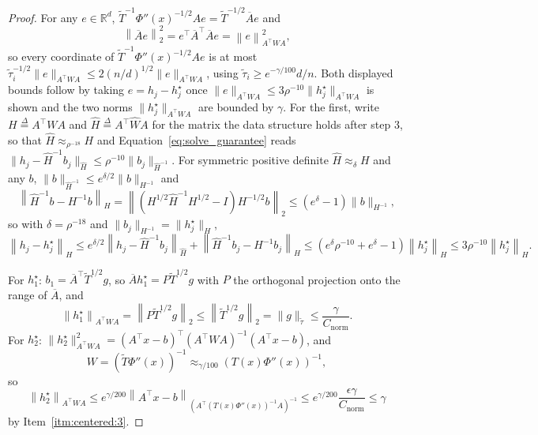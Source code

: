 \documentclass[11pt]{article}
\newcommand{\R}{\mathbb R}
\newcommand{\tautil}{\widetilde{\tau}}
\newcommand{\defeq}{\stackrel{\Delta}{=}}
\newcommand{\Cnorm}{C_{\mathrm{norm}}}
\begin{document}
\begin{proof}
For any $e \in \R^{d}$,
$\widetilde{T}^{-1} \Phi''(x)^{-1/2} A e = \widetilde{T}^{-1/2} \overline{A} e$
and
\[
\left\| \overline{A} e \right\|_{2}^{2}
=
e^\top \overline{A}^\top \overline{A} e
=
\left\| e \right\|_{A^\top W A}^{2},
\]
so every coordinate of $\widetilde{T}^{-1} \Phi''(x)^{-1/2} A e$ is at most
$\tautil_i^{-1/2} \|e\|_{A^\top W A} \le 2 (n/d)^{1/2} \|e\|_{A^\top W A}$,
using $\tautil_i \ge e^{-\gamma/100} d / n$.
Both displayed bounds follow by taking $e = h_j - h_j^{\star}$ once
$\|e\|_{A^\top W A} \le 3 \rho^{-10} \|h_j^{\star}\|_{A^\top W A}$ is shown and
the two norms $\|h_j^{\star}\|_{A^\top W A}$ are bounded by
$\gamma$.
For the first, write $H \defeq A^\top W A$ and
$\widehat H \defeq A^\top \widehat W A$ for the matrix the data structure holds
after step 3, so that $\widehat H \approx_{\rho^{-18}} H$ and
Equation~\eqref{eq:solve_guarantee} reads
$\|h_j - \widehat H^{-1} b_j\|_{\widehat H} \le \rho^{-10} \|b_j\|_{\widehat H^{-1}}$.
For symmetric positive definite $\widehat H \approx_{\delta} H$ and any
$b$,
$\|b\|_{\widehat H^{-1}} \le e^{\delta / 2} \|b\|_{H^{-1}}$ and
\[
\left\| \widehat H^{-1} b - H^{-1} b \right\|_{H}
=
\left\| \left( H^{1/2} \widehat H^{-1} H^{1/2} - I \right)
H^{-1/2} b \right\|_{2}
\le
\left( e^{\delta} - 1 \right) \|b\|_{H^{-1}},
\]
so with $\delta = \rho^{-18}$ and
$\|b_j\|_{H^{-1}} = \|h_j^{\star}\|_{H}$,
\[
\left\| h_j - h_j^{\star} \right\|_{H}
\le
e^{\delta / 2}
\left\| h_j - \widehat H^{-1} b_j \right\|_{\widehat H}
+ \left\| \widehat H^{-1} b_j - H^{-1} b_j \right\|_{H}
\le
\left( e^{\delta} \rho^{-10} + e^{\delta} - 1 \right)
\left\| h_j^{\star} \right\|_{H}
\le
3 \rho^{-10} \left\| h_j^{\star} \right\|_{H} .
\]

For $h_1^{\star}$:
$b_1 = \overline{A}^\top \widetilde{T}^{1/2} g$, so
$\overline{A} h_1^{\star} = P \widetilde{T}^{1/2} g$ with
$P$ the orthogonal projection onto the range of
$\overline{A}$, and
\[
\left\| h_1^{\star} \right\|_{A^\top W A}
=
\left\| P \widetilde{T}^{1/2} g \right\|_{2}
\le
\left\| \widetilde{T}^{1/2} g \right\|_{2}
=
\|g\|_{\tautil}
\le
\frac{\gamma}{\Cnorm} .
\]
For $h_2^{\star}$:
$\|h_2^{\star}\|_{A^\top W A}^{2} = (A^\top x - b)^\top (A^\top W A)^{-1} (A^\top x - b)$,
and
\[
W
=
\left( \widetilde{T} \Phi''(x) \right)^{-1}
\approx_{\gamma / 100}
\left( T(x) \Phi''(x) \right)^{-1},
\]
so
\[
\left\| h_2^{\star} \right\|_{A^\top W A}
\le
e^{\gamma / 200}
\left\| A^\top x - b \right\|_{(A^\top (T(x) \Phi''(x))^{-1} A)^{-1}}
\le
e^{\gamma / 200} \frac{\epsilon \gamma}{\Cnorm}
\le
\gamma
\]
by Item~\ref{itm:centered:3}.
\end{proof}
\end{document}
